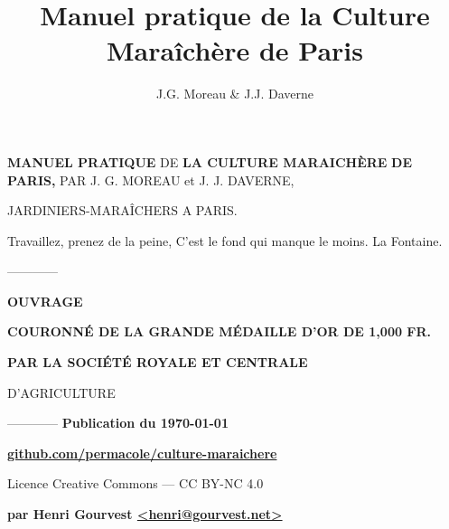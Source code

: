 \documentclass[10pt,a4paper]{book}
\author{J.G. Moreau & J.J. Daverne}
\title{Manuel pratique de la Culture Maraîchère de Paris}
\begin{document}
\pagestyle{empty}


\begin{titlepage}
\begin{center}
{\Large \textbf{MANUEL PRATIQUE}}
\linebreak
\linebreak
{\small DE}
\linebreak
\linebreak
{\LARGE \textbf{LA CULTURE MARAICHÈRE}}
\linebreak
\linebreak
{\Large \textbf{DE PARIS,}}
\linebreak
\linebreak
{\large PAR J. G. MOREAU et J. J. DAVERNE,}

\begin{tiny}
JARDINIERS-MARAÎCHERS A PARIS.
\end{tiny}
\end{center}

\begin{flushright}
Travaillez, prenez de la peine,\linebreak
C'est le fond qui manque le moins.\linebreak
La Fontaine.
\end{flushright}

\begin{center}
------------

{\large \textbf{OUVRAGE}}

\textbf{COURONNÉ DE LA GRANDE MÉDAILLE D'OR DE 1,000 {\small FR.}}

{\footnotesize \textbf{PAR LA SOCIÉTÉ ROYALE ET CENTRALE}}

{\large D'AGRICULTURE}

------------
\vfill
\textbf{Publication du \today}

\textbf{\href{https://github.com/permacole/culture-maraichere}{{\color{blue} github.com/permacole/culture-maraichere}}}

Licence Creative Commons --- CC BY-NC 4.0

\textbf{par Henri Gourvest \href{mailto:henri@gourvest.net}{{\color{blue} <henri@gourvest.net>}}}
\end{center}
\end{titlepage}

\pagestyle{fancy}
\fancyhf{}
\renewcommand{\chaptermark}[1]{\markboth{#1}{}}
\renewcommand{\sectionmark}[1]{\markright{#1}}

\end{document}
